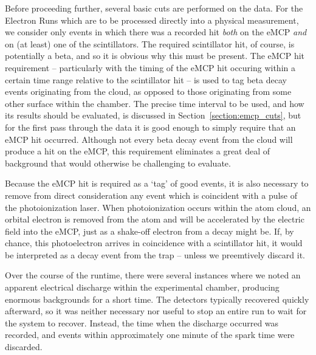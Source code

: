 Before proceeding further, several basic cuts are performed on the data.  For the Electron Runs which are to be processed directly into a physical measurement, we consider only events in which there was a recorded hit \emph{both} on the eMCP \emph{and} on (at least) one of the scintillators.  The required scintillator hit, of course, is potentially a beta, and so it is obvious why this must be present.  The eMCP hit requirement -- particularly with the timing of the eMCP hit occuring within a certain time range relative to the scintillator hit -- is used to tag beta decay events originating from the cloud, as opposed to those originating from some other surface within the chamber.  The precise time interval to be used, and how its results should be evaluated, is discussed in Section~\ref{section:emcp_cuts}, but for the first pass through the data it is good enough to simply require that an eMCP hit occurred.  Although not every beta decay event from the cloud will produce a hit on the eMCP, this requirement eliminates a great deal of background that would otherwise be challenging to evaluate.    
 
Because the eMCP hit is required as a `tag' of good events, it is also necessary to remove from direct consideration any event which is coincident with a pulse of the photoionization laser.  When photoionization occurs within the atom cloud, an orbital electron is removed from the atom and will be accelerated by the electric field into the eMCP, just as a shake-off electron from a decay might be.  If, by chance, this photoelectron arrives in coincidence with a scintillator hit, it would be interpreted as a decay event from the trap -- unless we preemtively discard it.  


Over the course of the runtime, there were several instances where we noted an apparent electrical discharge within the experimental chamber, producing enormous backgrounds for a short time.  The detectors typically recovered quickly afterward, so it was neither necessary nor useful to stop an entire run to wait for the system to recover.  Instead, the time when the discharge occurred was recorded, and events within approximately one minute of the spark time were discarded.  

